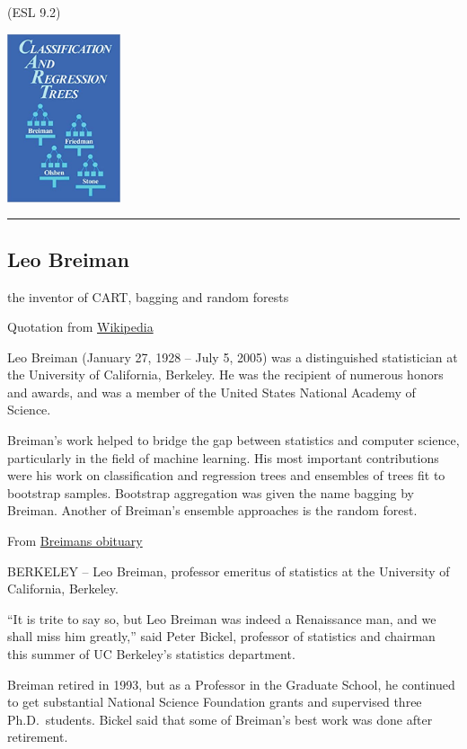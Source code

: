 \documentclass[
  letterpaper,
  DIV=11,
  numbers=noendperiod]{scrartcl}
\begin{document}
(ESL 9.2)

\includegraphics[width=0.25\textwidth,height=\textheight]{./cart.jpg}

\begin{center}\rule{0.5\linewidth}{0.5pt}\end{center}

\hypertarget{leo-breiman}{%
\subsection{Leo Breiman}\label{leo-breiman}}

the inventor of CART, bagging and random forests

Quotation from
\href{https://en.wikipedia.org/wiki/Leo_Breiman}{Wikipedia}

Leo Breiman (January 27, 1928 -- July 5, 2005) was a distinguished
statistician at the University of California, Berkeley. He was the
recipient of numerous honors and awards, and was a member of the United
States National Academy of Science.

Breiman's work helped to bridge the gap between statistics and computer
science, particularly in the field of machine learning. His most
important contributions were his work on classification and regression
trees and ensembles of trees fit to bootstrap samples. Bootstrap
aggregation was given the name bagging by Breiman. Another of Breiman's
ensemble approaches is the random forest.

From
\href{https://www.berkeley.edu/news/media/releases/2005/07/07_breiman.shtml}{Breimans
obituary}

BERKELEY -- Leo Breiman, professor emeritus of statistics at the
University of California, Berkeley.

``It is trite to say so, but Leo Breiman was indeed a Renaissance man,
and we shall miss him greatly,'' said Peter Bickel, professor of
statistics and chairman this summer of UC Berkeley's statistics
department.

Breiman retired in 1993, but as a Professor in the Graduate School, he
continued to get substantial National Science Foundation grants and
supervised three Ph.D.~students. Bickel said that some of Breiman's best
work was done after retirement.
\end{document}
